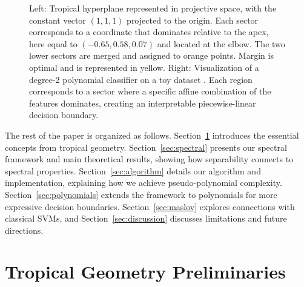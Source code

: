\documentclass{article}
\begin{document}
\begin{figure}[h]
    \centering
    \begin{subfigure}[b]{0.35\textwidth}
        \centering
        \resizebox{\textwidth}{!}{\clipbox{0.1\width{} 0.1\height{} 0.1\width{} 0.1\height{}}{}}
    \end{subfigure}
    \hfill
    \begin{subfigure}[b]{0.61\textwidth}
        \centering
        \resizebox{\textwidth}{!}{\clipbox{0.15\width{} 0.30\height{} 0.15\width{} 0.30\height{}}{}}
    \end{subfigure}
    \caption{Left: Tropical hyperplane represented in projective space, with the constant vector $(1, 1, 1)$ projected to the origin. Each sector corresponds to a coordinate that dominates relative to the apex, here equal to $(-0.65, 0.58, 0.07)$ and located at the elbow. The two lower sectors are merged and assigned to orange points. Margin is optimal and is represented in yellow. Right: Visualization of a degree-2 polynomial classifier on a toy dataset \cite{scikit-learn}. Each region corresponds to a sector where a specific affine combination of the features dominates, creating an interpretable piecewise-linear decision boundary.}
    \label{fig:tropical_poly}
\end{figure}
The rest of the paper is organized as follows. Section~\ref{sec:prelim} introduces the essential concepts from tropical geometry. Section~\ref{sec:spectral} presents our spectral framework and main theoretical results, showing how separability connects to spectral properties. Section~\ref{sec:algorithm} details our algorithm and implementation, explaining how we achieve pseudo-polynomial complexity. Section~\ref{sec:polynomials} extends the framework to polynomials for more expressive decision boundaries. Section~\ref{sec:maslov} explores connections with classical SVMs, and Section~\ref{sec:discussion} discusses limitations and future directions.

\section{Tropical Geometry Preliminaries}\label{sec:prelim}
\end{document}
